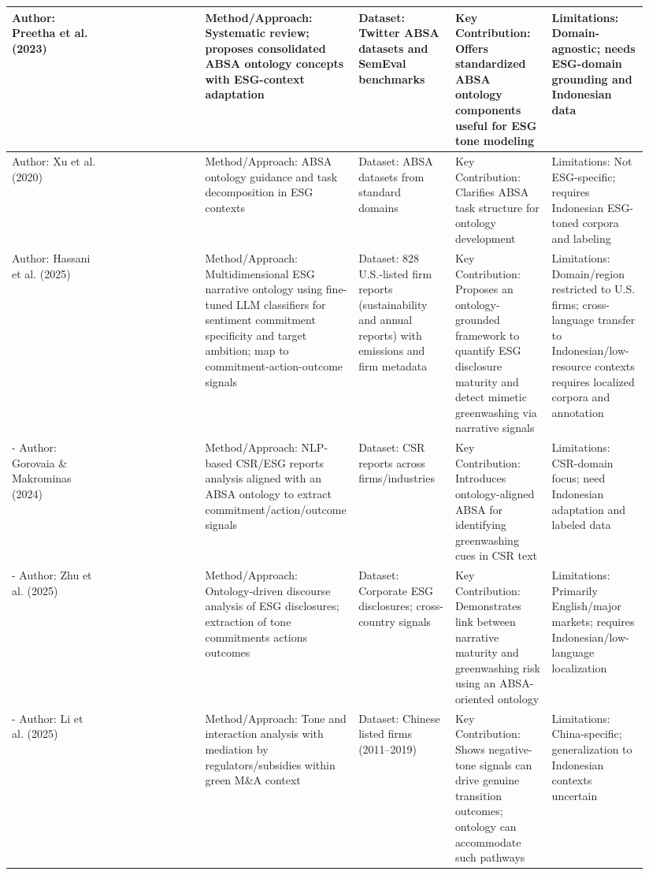 \documentclass{article}
\begin{document}
\begin{landscape}
\begin{longtable}{p{0.157\linewidth} p{0.157\linewidth} p{0.157\linewidth} p{0.157\linewidth} p{0.157\linewidth} p{0.157\linewidth}}
Author: Preetha et al. (2023) & ~ & Method/Approach: Systematic review; proposes consolidated ABSA ontology concepts with ESG-context adaptation & Dataset: Twitter ABSA datasets and SemEval benchmarks & Key Contribution: Offers standardized ABSA ontology components useful for ESG tone modeling & Limitations: Domain-agnostic; needs ESG-domain grounding and Indonesian data \\ \hline
Author: Xu et al. (2020) & ~ & Method/Approach: ABSA ontology guidance and task decomposition in ESG contexts & Dataset: ABSA datasets from standard domains & Key Contribution: Clarifies ABSA task structure for ontology development & Limitations: Not ESG-specific; requires Indonesian ESG-toned corpora and labeling \\ \hline
Author: Hassani et al. (2025) & ~ & Method/Approach: Multidimensional ESG narrative ontology using fine-tuned LLM classifiers for sentiment commitment specificity and target ambition; map to commitment-action-outcome signals & Dataset: 828 U.S.-listed firm reports (sustainability and annual reports) with emissions and firm metadata & Key Contribution: Proposes an ontology-grounded framework to quantify ESG disclosure maturity and detect mimetic greenwashing via narrative signals & Limitations: Domain/region restricted to U.S. firms; cross-language transfer to Indonesian/low-resource contexts requires localized corpora and annotation \\ \hline
- Author: Gorovaia \& Makrominas (2024) & ~ & Method/Approach: NLP-based CSR/ESG reports analysis aligned with an ABSA ontology to extract commitment/action/outcome signals & Dataset: CSR reports across firms/industries & Key Contribution: Introduces ontology-aligned ABSA for identifying greenwashing cues in CSR text & Limitations: CSR-domain focus; need Indonesian adaptation and labeled data \\ \hline
- Author: Zhu et al. (2025) & ~ & Method/Approach: Ontology-driven discourse analysis of ESG disclosures; extraction of tone commitments actions outcomes & Dataset: Corporate ESG disclosures; cross-country signals & Key Contribution: Demonstrates link between narrative maturity and greenwashing risk using an ABSA-oriented ontology & Limitations: Primarily English/major markets; requires Indonesian/low-language localization \\ \hline
- Author: Li et al. (2025) & ~ & Method/Approach: Tone and interaction analysis with mediation by regulators/subsidies within green M\&A context & Dataset: Chinese listed firms (2011–2019) & Key Contribution: Shows negative-tone signals can drive genuine transition outcomes; ontology can accommodate such pathways & Limitations: China-specific; generalization to Indonesian contexts uncertain \\ \hline

\end{longtable}
\end{landscape}
\end{document}
